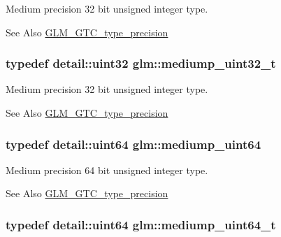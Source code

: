 Medium precision 32 bit unsigned integer type. \begin{DoxySeeAlso}{See Also}
\hyperlink{group__gtc__type__precision}{G\-L\-M\-\_\-\-G\-T\-C\-\_\-type\-\_\-precision} 
\end{DoxySeeAlso}
\hypertarget{group__gtc__type__precision_gac7782c1e393f9ad47e41a177a685f287}{
\subsubsection[{mediump\-\_\-uint32\-\_\-t}]{\setlength{\rightskip}{0pt plus 5cm}typedef detail\-::uint32 {\bf glm\-::mediump\-\_\-uint32\-\_\-t}}}\label{group__gtc__type__precision_gac7782c1e393f9ad47e41a177a685f287}
Medium precision 32 bit unsigned integer type. \begin{DoxySeeAlso}{See Also}
\hyperlink{group__gtc__type__precision}{G\-L\-M\-\_\-\-G\-T\-C\-\_\-type\-\_\-precision} 
\end{DoxySeeAlso}
\hypertarget{group__gtc__type__precision_ga6685788d15d0a973ee7c2460d0456dc1}{
\subsubsection[{mediump\-\_\-uint64}]{\setlength{\rightskip}{0pt plus 5cm}typedef detail\-::uint64 {\bf glm\-::mediump\-\_\-uint64}}}\label{group__gtc__type__precision_ga6685788d15d0a973ee7c2460d0456dc1}
Medium precision 64 bit unsigned integer type. \begin{DoxySeeAlso}{See Also}
\hyperlink{group__gtc__type__precision}{G\-L\-M\-\_\-\-G\-T\-C\-\_\-type\-\_\-precision} 
\end{DoxySeeAlso}
\hypertarget{group__gtc__type__precision_gaa97354d3120a6dc029a5e9563723de18}{
\subsubsection[{mediump\-\_\-uint64\-\_\-t}]{\setlength{\rightskip}{0pt plus 5cm}typedef detail\-::uint64 {\bf glm\-::mediump\-\_\-uint64\-\_\-t}}}\label{group__gtc__type__precision_gaa97354d3120a6dc029a5e9563723de18}
